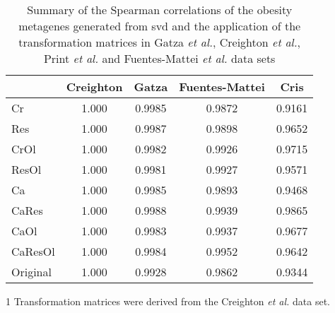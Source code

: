 \begin{table}[htpb]
	\centering
	\begin{threeparttable}
		\caption{Summary of the Spearman correlations of the obesity metagenes generated from \gls{svd} and the application of the transformation matrices in Gatza \textit{et al.}, Creighton \textit{et al.}, Print \textit{et al.} and Fuentes-Mattei \textit{et al.} data sets}
		\label{tab:svd_vs_tm_obs}
		\begin{tabular}{lcccc}
			& Creighton & Gatza  & Fuentes-Mattei & Cris\\
			\hline
			\hline
			\rule{0pt}{2.25ex} Cr & 1.000     & 0.9985 & 0.9872 & 0.9161 \\
			Res                   & 1.000     & 0.9987 & 0.9898 & 0.9652 \\
			CrOl                  & 1.000     & 0.9982 & 0.9926 & 0.9715 \\
			ResOl                 & 1.000     & 0.9981 & 0.9927 & 0.9571 \\
			Ca                    & 1.000     & 0.9985 & 0.9893 & 0.9468 \\
			CaRes                 & 1.000     & 0.9988 & 0.9939 & 0.9865 \\
			CaOl                  & 1.000     & 0.9983 & 0.9937 & 0.9677 \\
			CaResOl               & 1.000     & 0.9984 & 0.9952 & 0.9642 \\
			Original              & 1.000     & 0.9928 & 0.9862 & 0.9344 \\
			\hline
			\hline
		\end{tabular}
			\begin{tablenotes}
				\begin{footnotesize}
				\item [1] Transformation matrices were derived from the Creighton \textit{et al.} data set.
				\end{footnotesize}
			\end{tablenotes}
	\end{threeparttable}
\end{table}

